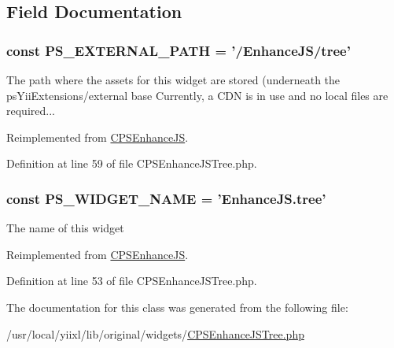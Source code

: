 \subsection{Field Documentation}
\hypertarget{classCPSEnhanceJSTree_a8ccb5e1d65c091f944a6aa8c5be834ca}{
\subsubsection[{PS\_\-EXTERNAL\_\-PATH}]{\setlength{\rightskip}{0pt plus 5cm}const {\bf PS\_\-EXTERNAL\_\-PATH} = '/EnhanceJS/tree'}}
\label{classCPSEnhanceJSTree_a8ccb5e1d65c091f944a6aa8c5be834ca}
The path where the assets for this widget are stored (underneath the psYiiExtensions/external base Currently, a CDN is in use and no local files are required... 

Reimplemented from \hyperlink{classCPSEnhanceJS_a8ccb5e1d65c091f944a6aa8c5be834ca}{CPSEnhanceJS}.



Definition at line 59 of file CPSEnhanceJSTree.php.

\hypertarget{classCPSEnhanceJSTree_ae357f9dc377f7de0d12010b2ced28cbc}{
\subsubsection[{PS\_\-WIDGET\_\-NAME}]{\setlength{\rightskip}{0pt plus 5cm}const {\bf PS\_\-WIDGET\_\-NAME} = 'EnhanceJS.tree'}}
\label{classCPSEnhanceJSTree_ae357f9dc377f7de0d12010b2ced28cbc}
The name of this widget 

Reimplemented from \hyperlink{classCPSEnhanceJS_ae357f9dc377f7de0d12010b2ced28cbc}{CPSEnhanceJS}.



Definition at line 53 of file CPSEnhanceJSTree.php.



The documentation for this class was generated from the following file:\begin{DoxyCompactItemize}
\item 
/usr/local/yiixl/lib/original/widgets/\hyperlink{CPSEnhanceJSTree_8php}{CPSEnhanceJSTree.php}\end{DoxyCompactItemize}
